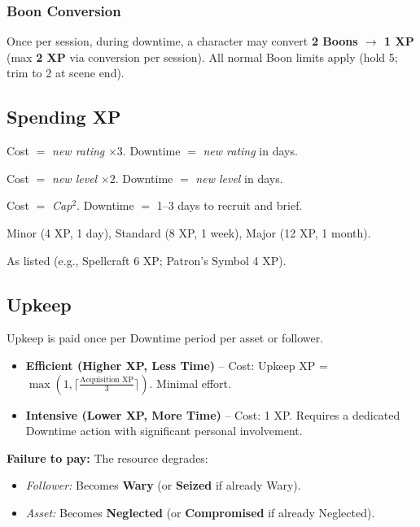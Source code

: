 \subsubsection{Boon Conversion}
Once per session, during downtime, a character may convert \textbf{2 Boons $\rightarrow$ 1 XP} (max \textbf{2 XP} via conversion per session). All normal Boon limits apply (hold 5; trim to 2 at scene end).

\subsection{Spending XP}
\label{sec:spendingxp}
\begin{description}[leftmargin=1.5em, style=nextline]
  \item[Attributes:] Cost $=$ \emph{new rating} $\times 3$. Downtime $=$ \emph{new rating} in days.
  \item[Skills:] Cost $=$ \emph{new level} $\times 2$. Downtime $=$ \emph{new level} in days.
  \item[On‑Screen Followers:] Cost $=$ \emph{Cap}$^2$. Downtime $=$ 1--3 days to recruit and brief.
  \item[Off‑Screen Assets (Minor/Standard/Major):] Minor (4 XP, 1 day), Standard (8 XP, 1 week), Major (12 XP, 1 month).
  \item[Talents/Minor Assets:] As listed (e.g., Spellcraft 6 XP; Patron's Symbol 4 XP).
\end{description}

\subsection{Upkeep}
Upkeep is paid once per Downtime period per asset or follower.

\begin{itemize}
  \item \textbf{Efficient (Higher XP, Less Time)} -- Cost: Upkeep XP = $\max(1, \lceil \frac{\text{Acquisition XP}}{3} \rceil)$. Minimal effort.
  \item \textbf{Intensive (Lower XP, More Time)} -- Cost: 1 XP. Requires a dedicated Downtime action with significant personal involvement.
\end{itemize}

\textbf{Failure to pay:} The resource degrades:
\begin{itemize}
  \item \emph{Follower:} Becomes \textbf{Wary} (or \textbf{Seized} if already Wary).
  \item \emph{Asset:} Becomes \textbf{Neglected} (or \textbf{Compromised} if already Neglected).
\end{itemize}

